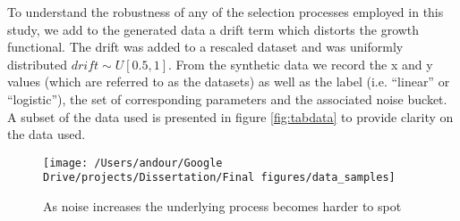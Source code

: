 \documentclass[12pt,]{article}
\begin{document}
\begin{table}[!h]

\caption{\label{tab:dataexample}Meta data of generated datasets for experiments}
\centering
{}
\end{table}

To understand the robustness of any of the selection processes employed in this study, we add to the generated data a drift term which distorts the growth functional. The drift was added to a rescaled dataset and was uniformly distributed \(drift \sim U[0.5, 1]\). From the synthetic data we record the x and y values
(which are referred to as the datasets) as well as the label (i.e. ``linear'' or ``logistic''), the set of corresponding parameters and the associated noise bucket. A subset of the data used is presented in figure \ref{fig:tabdata} to provide clarity on the data used.

\begin{figure}

{\centering \texttt{[image: /Users/andour/Google Drive/projects/Dissertation/Final figures/data\_samples]} 

}

\caption{As noise increases the underlying process becomes harder to spot}\label{fig:noisy}
\end{figure}
\end{document}
